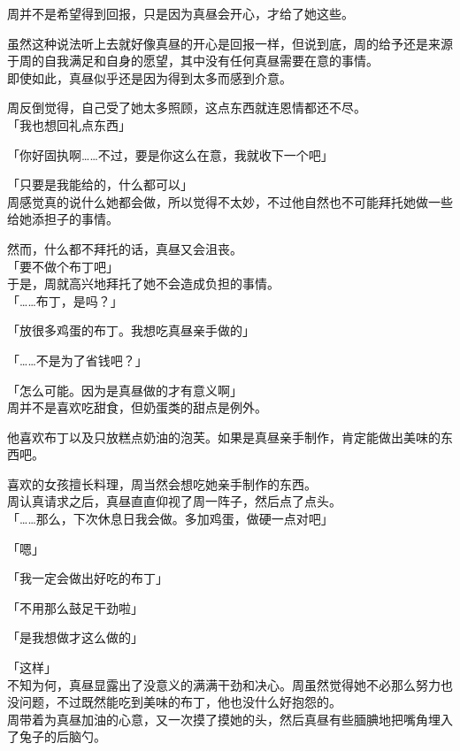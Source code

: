 周并不是希望得到回报，只是因为真昼会开心，才给了她这些。

虽然这种说法听上去就好像真昼的开心是回报一样，但说到底，周的给予还是来源于周的自我满足和自身的愿望，其中没有任何真昼需要在意的事情。\\

即使如此，真昼似乎还是因为得到太多而感到介意。

周反倒觉得，自己受了她太多照顾，这点东西就连恩情都还不尽。\\

「我也想回礼点东西」

「你好固执啊……不过，要是你这么在意，我就收下一个吧」

「只要是我能给的，什么都可以」\\

周感觉真的说什么她都会做，所以觉得不太妙，不过他自然也不可能拜托她做一些给她添担子的事情。

然而，什么都不拜托的话，真昼又会沮丧。\\

「要不做个布丁吧」\\

于是，周就高兴地拜托了她不会造成负担的事情。\\

「……布丁，是吗？」

「放很多鸡蛋的布丁。我想吃真昼亲手做的」

「……不是为了省钱吧？」

「怎么可能。因为是真昼做的才有意义啊」\\

周并不是喜欢吃甜食，但奶蛋类的甜点是例外。

他喜欢布丁以及只放糕点奶油的泡芙。如果是真昼亲手制作，肯定能做出美味的东西吧。

喜欢的女孩擅长料理，周当然会想吃她亲手制作的东西。\\

周认真请求之后，真昼直直仰视了周一阵子，然后点了点头。\\

「……那么，下次休息日我会做。多加鸡蛋，做硬一点对吧」

「嗯」

「我一定会做出好吃的布丁」

「不用那么鼓足干劲啦」

「是我想做才这么做的」

「这样」\\

不知为何，真昼显露出了没意义的满满干劲和决心。周虽然觉得她不必那么努力也没问题，不过既然能吃到美味的布丁，他也没什么好抱怨的。\\

周带着为真昼加油的心意，又一次摸了摸她的头，然后真昼有些腼腆地把嘴角埋入了兔子的后脑勺。
